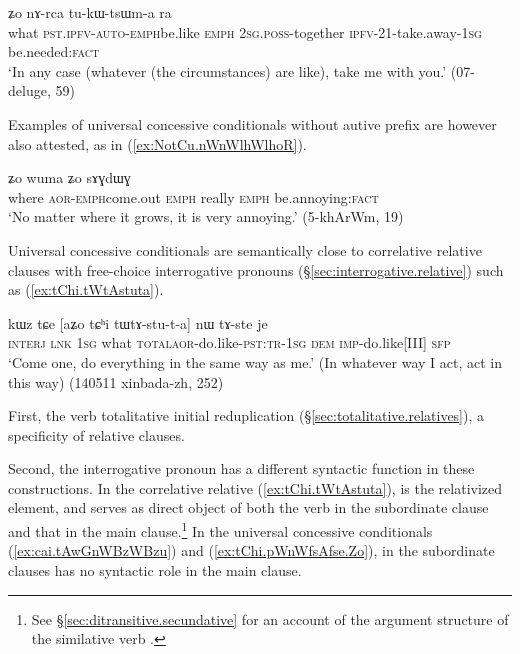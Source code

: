  \begin{exe}
\ex \label{ex:tChi.pWnWfsAfse.Zo}
 ʑo nɤ-rca tu-kɯ-tsɯm-a ra \\
what \textsc{pst}.\textsc{ipfv}-\textsc{auto}-\textsc{emph}\redp{}be.like \textsc{emph} \textsc{2sg}.\textsc{poss}-together \textsc{ipfv}-2\fl{}1-take.away-\textsc{1sg} be.needed:\textsc{fact} \\
\glt `In any case (whatever (the circumstances) are like), take me with you.' (07-deluge, 59)
\end{exe}
Examples of universal concessive conditionals without autive prefix are however also attested, as in (\ref{ex:NotCu.nWnWlhWlhoR}).

\begin{exe}
\ex \label{ex:NotCu.nWnWlhWlhoR}
 ʑo wuma ʑo sɤɣdɯɣ \\
where \textsc{aor}-\textsc{emph}\redp{}come.out \textsc{emph} really \textsc{emph} be.annoying:\textsc{fact} \\
\glt `No matter where it grows, it is very annoying.' (5-khArWm, 19)
\end{exe}

Universal concessive conditionals are semantically close to correlative relative clauses with free-choice interrogative pronouns (§\ref{sec:interrogative.relative}) such as (\ref{ex:tChi.tWtAstuta}). 

\begin{exe}
\ex \label{ex:tChi.tWtAstuta}
\gll kɯz tɕe [aʑo tɕʰi tɯ\redp{}tɤ-stu-t-a] nɯ tɤ-ste je \\
\textsc{interj} \textsc{lnk} \textsc{1sg} what \textsc{total}\redp{}\textsc{aor}-do.like-\textsc{pst}:\textsc{tr}-\textsc{1sg} \textsc{dem} \textsc{imp}-do.like[III] \textsc{sfp} \\
\glt `Come one, do everything in the same way as me.' (In whatever way I act, act in this way) (140511 xinbada-zh, 252)
\end{exe}

First, the verb  totalitative initial reduplication (§\ref{sec:totalitative.relatives}), a specificity of relative clauses. 

Second, the interrogative pronoun  has a different syntactic function in these constructions. In the correlative relative (\ref{ex:tChi.tWtAstuta}),  is the relativized element, and serves as direct object of both the verb in the subordinate clause and that in the main clause.\footnote{See §\ref{sec:ditransitive.secundative} for an account of the argument structure of the similative verb . } In the universal concessive conditionals (\ref{ex:cai.tAwGnWBzWBzu}) and (\ref{ex:tChi.pWnWfsAfse.Zo}),  in the subordinate clauses has no syntactic role in the main clause.
  
